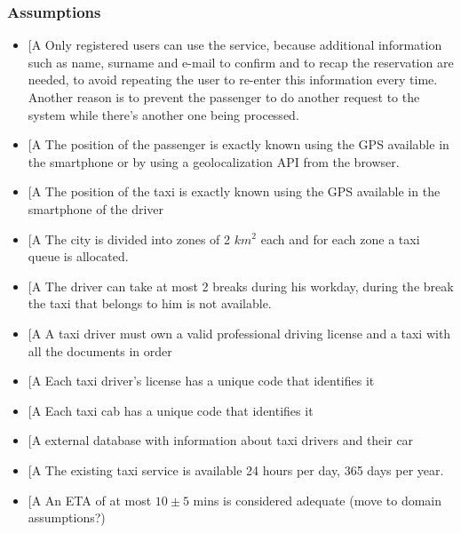 \documentclass[a4paper,12pt]{article}%
\newcounter{assumptions_counter}
\begin{document}
\subsubsection{Assumptions}
\begin{itemize}
\item \label{a\arabic{assumptions_counter}}{[}A\arabic{assumptions_counter}{]}
Only registered users can use the service, because additional information such as name, surname and e-mail to confirm and to recap the reservation are needed, to avoid repeating the user to re-enter this information every time.
Another reason is to prevent the passenger to do another request to the system while there’s another one being processed.
\item \label{a\arabic{assumptions_counter}}{[}A\arabic{assumptions_counter}{]} The position of the passenger is exactly known using the GPS available in the smartphone or by using a geolocalization API from the browser. 
\item \label{a\arabic{assumptions_counter}}{[}A\arabic{assumptions_counter}{]} The position of the taxi is exactly known using the GPS available in the smartphone of the driver
\item \label{a\arabic{assumptions_counter}}{[}A\arabic{assumptions_counter}{]} The city is divided into zones of 2 $km^2$ each and for each zone a taxi queue is allocated.
\item \label{a\arabic{assumptions_counter}}{[}A\arabic{assumptions_counter}{]} The driver can take at most 2 breaks during his workday, during the break the taxi that belongs to him is not available.
\item \label{a\arabic{assumptions_counter}}{[}A\arabic{assumptions_counter}{]} A taxi driver must own a valid professional driving license and a taxi with all the documents in order
\item \label{a\arabic{assumptions_counter}}{[}A\arabic{assumptions_counter}{]} Each taxi driver's license has a unique code that identifies it
\item \label{a\arabic{assumptions_counter}}{[}A\arabic{assumptions_counter}{]} Each taxi cab has a unique code that identifies it
\item \label{a\arabic{assumptions_counter}}{[}A\arabic{assumptions_counter}{]} external database with information about taxi drivers and their car 
\item \label{a\arabic{assumptions_counter}}{[}A\arabic{assumptions_counter}{]} The existing taxi service is available 24 hours per day, 365 days per year.
\item \label{a\arabic{assumptions_counter}}{[}A\arabic{assumptions_counter}{]} An ETA of at most $10 \pm 5$ mins is considered adequate (move to domain assumptions?)
\end{itemize}
\end{document}
